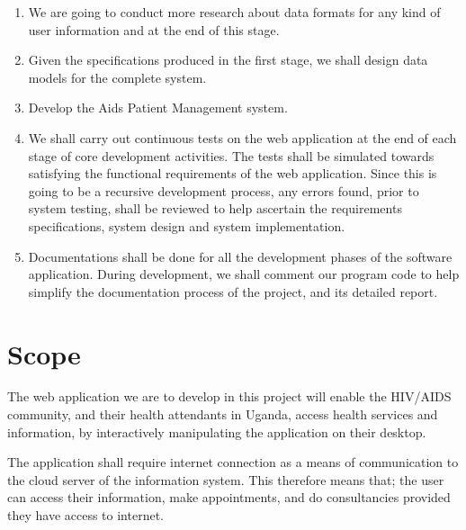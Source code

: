 \documentclass[12pt]{article}
\begin{document}
\vspace{\baselineskip}
\setlength{\parskip}{0.0pt}
\begin{enumerate}
	\item We are going to conduct more research about data formats for any kind of user information and at the end of this stage.\par

	\item Given the specifications produced in the first stage, we shall design data models for the complete system.\par

	\item Develop the Aids Patient Management system. \par

	\item We shall carry out continuous tests on the web application at the end of each stage of core development activities. The tests shall be simulated towards satisfying the functional requirements of the web application. Since this is going to be a recursive development process, any errors found, prior to system testing, shall be reviewed to help ascertain the requirements specifications, system design and system implementation.\par

	\item Documentations shall be done for all the development phases of the software application. During development, we shall comment our program code to help simplify the documentation process of the project, and its detailed report.
\end{enumerate}\par

\setlength{\parskip}{8.04pt}
\section{Scope}
The web application we are to develop in this project will enable the HIV/AIDS community, and their health attendants in Uganda, access health services and information, by interactively manipulating the application on their desktop.\par

The application shall require internet connection as a means of communication to the cloud server of the information system. This therefore means that; the user can access their information, make appointments, and do consultancies provided they have access to internet. \par
\end{document}
